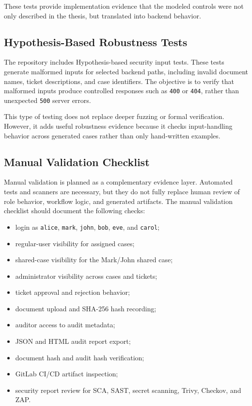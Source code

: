 \documentclass[12pt,a4paper]{report}
\begin{document}
These tests provide implementation evidence that the modeled controls were not only described in the thesis, but translated into backend behavior.

\subsection{Hypothesis-Based Robustness Tests}

The repository includes Hypothesis-based security input tests. These tests generate malformed inputs for selected backend paths, including invalid document names, ticket descriptions, and case identifiers. The objective is to verify that malformed inputs produce controlled responses such as \texttt{400} or \texttt{404}, rather than unexpected \texttt{500} server errors.

This type of testing does not replace deeper fuzzing or formal verification. However, it adds useful robustness evidence because it checks input-handling behavior across generated cases rather than only hand-written examples.

\subsection{Manual Validation Checklist}

Manual validation is planned as a complementary evidence layer. Automated tests and scanners are necessary, but they do not fully replace human review of role behavior, workflow logic, and generated artifacts. The manual validation checklist should document the following checks:

\begin{itemize}
    \item login as \texttt{alice}, \texttt{mark}, \texttt{john}, \texttt{bob}, \texttt{eve}, and \texttt{carol};
    \item regular-user visibility for assigned cases;
    \item shared-case visibility for the Mark/John shared case;
    \item administrator visibility across cases and tickets;
    \item ticket approval and rejection behavior;
    \item document upload and SHA-256 hash recording;
    \item auditor access to audit metadata;
    \item JSON and HTML audit report export;
    \item document hash and audit hash verification;
    \item GitLab CI/CD artifact inspection;
    \item security report review for SCA, SAST, secret scanning, Trivy, Checkov, and ZAP.
\end{itemize}
\end{document}
